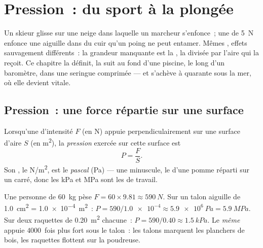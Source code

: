 \chapter{Pression~: du sport à la plongée}\label{ch:g10:pressure}

Un skieur glisse sur une neige dans laquelle un marcheur s'enfonce~; une
 de \qty{5}{N} enfonce une aiguille dans du cuir qu'un poing ne
peut entamer. Mêmes , effets sauvagement différents~: la
grandeur manquante est la \emph{}, la
 divisée par l'aire qui la reçoit. Ce chapitre la
définit, la suit au fond d'une piscine, le long d'un baromètre, dans une
seringue comprimée --- et s'achève à quarante  sous la
mer, où elle devient vitale.

\section{Pression~: une force répartie sur une surface}

\begin{definition}[Pression]\label{def:g10:pressure:pressure}
Lorsqu'une  d'intensité $F$ (en \unit{N}) appuie
perpendiculairement sur une surface d'aire $S$ (en \unit{m^2}), la
\emph{pression} exercée sur cette surface est
\[
P = \frac{F}{S}.
\]
Son , le \unit{N/m^2}, est le \emph{pascal}
(\unit{Pa}) --- une  minuscule, le
 d'une pomme réparti sur un
 carré, donc les \unit{kPa} et \unit{MPa} sont les
 de travail.
\end{definition}

\begin{example}\label{ex:g10:pressure:snowshoe}
Une personne de \qty{60}{kg} pèse $F = 60 \times 9.81 \approx
\qty{590}{N}$. Sur un talon aiguille de
\qty{1.0}{cm^2} = \qty{1.0e-4}{m^2}~:
$P = 590/\num{1.0e-4} \approx \qty{5.9e6}{Pa} = \qty{5.9}{MPa}$. Sur
deux raquettes de \qty{0.20}{m^2} chacune~:
$P = 590/0.40 \approx \qty{1.5}{kPa}$. Le \emph{même}
 appuie $4000$~fois plus fort sous le talon~: les
talons marquent les planchers de bois, les raquettes flottent sur la
poudreuse.
\end{example}


